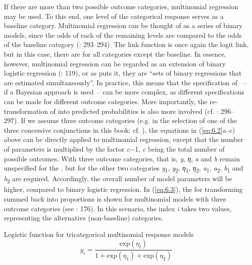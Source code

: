If there are more than two possible outcome categories, multinomial regression may be used. To this end, one level of the categorical response serves as a baseline category. Multinomial regression can be thought of as a series of binary models, since the odds of each of the remaining levels are compared to the odds of the baseline category (\citealt{Agresti2013}: 293–294). The link function is once again the logit link, but in this case, there are  for all categories except the baseline. In essence, however, multinomial regression can be regarded as an extension of binary logistic regression (\citealt{GelmanHill2007}: 119), or as \citet[173]{Long2015} puts it, they are “sets of binary regressions that are estimated simultaneously”. In practice, this means that the specification of ~– if a Bayesian approach is used~– can be more complex, as different specifications can be made for different outcome categories. More importantly, the re-transformation of  into predicted probabilities is also more involved (cf. \citealt{Agresti2013}: 296–297). If we assume three outcome categories (e.g. in the selection of one of the three concessive conjunctions in this book; cf. ), the equations in (\ref{eq:6.2}a--c) above can be directly applied to multinomial regression, except that the number of parameters is multiplied by the factor \textit{c}$-$1, \textit{c} being the total number of possible outcomes. With three outcome categories, that is, \textit{y}, \textit{η}, \textit{a} and \textit{b} remain unspecified for the , but for the other two categories \textit{y}\textsubscript{1}, \textit{y}\textsubscript{2}, \textit{η}\textsubscript{1}, \textit{η}\textsubscript{2}, \textit{a}\textsubscript{1}, \textit{a}\textsubscript{2}, \textit{b}\textsubscript{1} and \textit{b}\textsubscript{2} are required. Accordingly, the overall number of model parameters will be higher, compared to binary logistic regression. In (\ref{eq:6.3}), the  for transforming summed  back into proportions is shown for multinomial models with three outcome categories (see \citealt{Long2015}: 176). In this scenario, the index \textit{i} takes two values, representing the alternative (non-baseline) categories.

\ea\label{bkm:Ref40425386}\label{eq:6.3}%
Logistic function for tricategorical multinomial response models
\[y_i = \frac{\text{exp}(\eta_i)}{1+\text{exp}(\eta_1)+\text{exp}(\eta_2)}\]
\z

